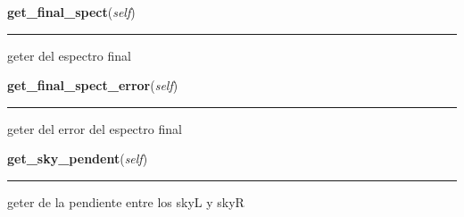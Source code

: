     \label{spectro_metria:spect:get_final_spect}

    \vspace{0.5ex}

\hspace{.8\funcindent}\begin{boxedminipage}{\funcwidth}

    \raggedright \textbf{get\_final\_spect}(\textit{self})

    \vspace{-1.5ex}

    \rule{\textwidth}{0.5\fboxrule}
\setlength{\parskip}{2ex}
    geter del espectro final

\setlength{\parskip}{1ex}
    \end{boxedminipage}

    \label{spectro_metria:spect:get_final_spect_error}

    \vspace{0.5ex}

\hspace{.8\funcindent}\begin{boxedminipage}{\funcwidth}

    \raggedright \textbf{get\_final\_spect\_error}(\textit{self})

    \vspace{-1.5ex}

    \rule{\textwidth}{0.5\fboxrule}
\setlength{\parskip}{2ex}
    geter del error del espectro final

\setlength{\parskip}{1ex}
    \end{boxedminipage}

    \label{spectro_metria:spect:get_sky_pendent}

    \vspace{0.5ex}

\hspace{.8\funcindent}\begin{boxedminipage}{\funcwidth}

    \raggedright \textbf{get\_sky\_pendent}(\textit{self})

    \vspace{-1.5ex}

    \rule{\textwidth}{0.5\fboxrule}
\setlength{\parskip}{2ex}
    geter de la pendiente entre los skyL y skyR

\setlength{\parskip}{1ex}
    \end{boxedminipage}

